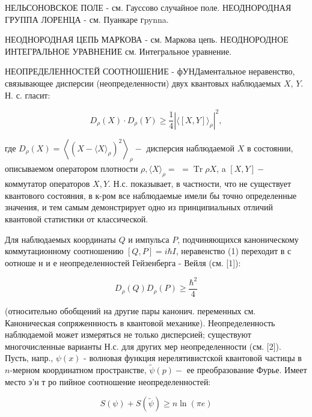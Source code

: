 \documentclass[10pt]{article}
\begin{document}
НЕЛЬСОНОВСКОЕ ПОЛЕ - см. Гауссово случайное поле. НЕОДНОРОДНАЯ ГРУППА ЛОРЕНЦА - см. Пуанкаре гpynna.



НЕОДНОРОДНАЯ ЦЕПЬ МАРКОВА - см. Маркова цепь. НЕОДНОРОДНОЕ ИНТЕГРАЛЬНОЕ УРАВНЕНИЕ см. Интегральное уравнение.



НЕОПРЕДЕЛЕННОСТЕЙ СООТНОШЕНИЕ - фУНДаментальное неравенство, связывающее дисперсии (неопределенности) двух квантовых наблюдаемых $X$, $Y$. Н. с. гласит:



\[

D_{\rho}(X) \cdot D_{\rho}(Y) \geqslant \frac{1}{4}\left|\langle[X, Y]\rangle_{\rho}\right|^{2},

\]



где $D_{\rho}(X)=\left\langle\left(X-\langle X\rangle_{\rho}\right)^{2}\right\rangle_{\rho}-$ дисперсия наблюдаемой $X$ в состоянии, описываемом оператором плотности $\rho,\langle X\rangle_{\rho}=$ $=\operatorname{Tr} \rho X$, a $[X, Y]-$ коммутатор операторов $X, Y$. Н.с. показывает, в частности, что не существует квантового состояния, в к-ром все наблюдаемые имели бы точно определенные значения, и тем самым демонстрирует одно из принципиальных отличий квантовой статистики от классической.



Для наблюдаемых координаты $Q$ и импульса $P$, подчиняющихся каноническому коммутационному соотношению $[Q, P]=i \hbar I$, неравенство (1) переходит в с оотноше н и е неопределенностей Гейзенберга - Вейля (см. [1]):



\[

D_{\rho}(Q) D_{\rho}(P) \geqslant \frac{\hbar^{2}}{4}

\]



(относительно обобщений на другие пары канонич. переменных см. Каноническая сопряженнность в квантовой механике). Неопределенность наблюдаемой может измеряться не только дисперсией; существуют многочисленные варианты Н.с. для других мер неопределенности (см. [2]). Пусть, напр., $\psi(x)$ - волновая функция нерелятивистской квантовой частицы в $n$-мерном координатном пространстве, $\tilde{\psi}(p)-$ ее преобразование Фурье. Имеет место э'н т ро пийное соотношение неопределенностей:



\[

S(\psi)+S(\tilde{\psi}) \geqslant n \ln (\pi e)

\]
\end{document}
